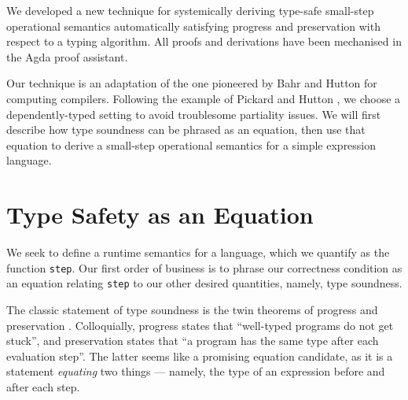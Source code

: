 \documentclass[manuscript,screen,sigplan]{acmart}
\begin{document}


We developed a new technique for systemically deriving type-safe
small-step operational semantics automatically satisfying progress and
preservation with respect to a typing algorithm. All proofs and
derivations have been mechanised in the Agda proof assistant.

Our technique is an adaptation of the one pioneered by Bahr and Hutton
\cite{bahr:2015} for computing compilers. Following the example of
Pickard and Hutton \cite{pickard:2021}, we choose a dependently-typed
setting to avoid troublesome partiality issues. We will first describe
how type soundness can be phrased as an equation, then use that equation
to derive a small-step operational semantics for a simple expression
language.

\section{Type Safety as an Equation}

We seek to define a runtime semantics for a language, which we quantify as
the function \texttt{step}.  Our first order of business is to phrase our
correctness condition as an equation relating \texttt{step} to our other
desired quantities, namely, type soundness.

The classic statement of type soundness is the twin theorems of
progress and preservation \cite{harper:pfpl}. Colloquially, progress states
that ``well-typed programs do not get stuck'', and preservation states that
``a program has the same type after each evaluation step''. The latter seems
like a promising equation candidate, as it is a statement \emph{equating} two
things --- namely, the type of an expression before and after each step.
\end{document}
